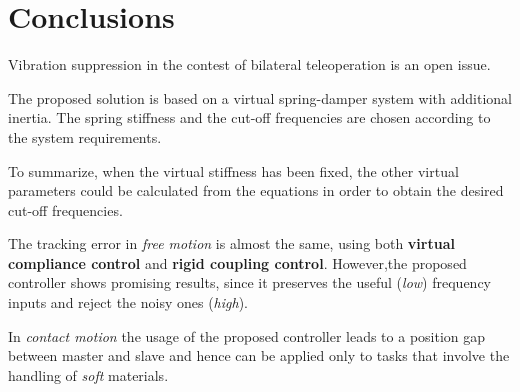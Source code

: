 \newpage

\section{Conclusions}
Vibration suppression in the contest of bilateral teleoperation is an open
issue.
\bigskip

The proposed solution is based on a virtual spring-damper system with additional
inertia. The spring stiffness and the cut-off frequencies are chosen according to the system requirements.
\bigskip

To summarize, when the virtual stiffness has been fixed, the other virtual
parameters could be calculated from the equations in order to obtain the desired
cut-off frequencies.
\bigskip

The tracking error in \textit{free motion} is almost the same, using both \textbf{virtual compliance control} and \textbf{rigid coupling control}. However,the proposed controller shows promising results, since it preserves the useful (\textsl{low}) frequency inputs and reject the noisy ones (\textsl{high}). 
\bigskip

In \textit{contact motion} the usage of the proposed controller leads to a position gap between master and slave and hence can be applied only to tasks that involve the handling of \textsl{soft} materials.


